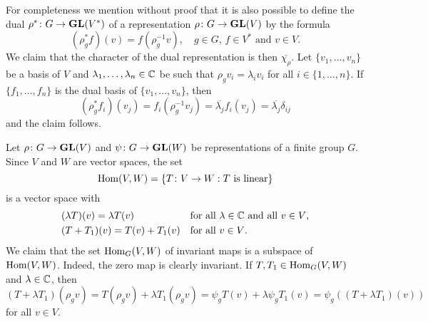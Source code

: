 For completeness we mention without proof that
it is also possible to define the dual $\rho^*\colon G\to\mathbf{GL}(V^*)$  
of a representation
$\rho\colon G\to\mathbf{GL}(V)$ by the formula
\[
(\rho^*_gf)(v)=f(\rho^{-1}_gv),\quad
g\in G,\,f\in V^*\text{ and }v\in V.
\]  
We claim that the character of the dual representation is then 
$\overline{\chi_\rho}$. Let $\{v_1,\dots,v_n\}$ be a basis of $V$
and $\lambda_1,\dots,\lambda_n\in\mathbb{C}$ be such that $\rho_gv_i=\lambda_iv_i$ for all $i\in\{1,\dots,n\}$. If $\{f_1,\dots,f_n\}$ is the dual basis of $\{v_1,\dots,v_n\}$, then 
\[
(\rho^*_gf_i)(v_j)=f_i(\rho_g^{-1}v_j)
=\overline{\lambda_j}f_i(v_j)
=\overline{\lambda_j}\delta_{ij}
\]
and the claim follows. 
%	
%
%	
%	  
%	


Let $\rho\colon G\to\mathbf{GL}(V)$ and $\psi\colon G\to\mathbf{GL}(W)$ be representations of a finite group
$G$. Since $V$ and $W$ are vector spaces, the set 
\[
\operatorname{Hom}(V,W)=\{T\colon V\to W:\text{$T$ is linear}\}
\]
is a vector space with 
\begin{align*}
&(\lambda T)(v)=\lambda T(v) && \text{for all $\lambda\in\mathbb{C}$ and all $v\in V$,}\\ 
&(T+T_1)(v)=T(v)+T_1(v) &&\text{for all $v\in V$.}
\end{align*}
We claim that the set $\operatorname{Hom}_G(V,W)$ of invariant maps
is a subspace of $\operatorname{Hom}(V,W)$. Indeed, the zero map is clearly invariant. If $T,T_1\in\operatorname{Hom}_G(V,W)$ 
and $\lambda\in\mathbb{C}$, then
\[
(T+\lambda T_1)(\rho_g v)
=T(\rho_gv)+\lambda T_1(\rho_gv)
=\psi_gT(v)+\lambda \psi_gT_1(v)
=\psi_g((T+\lambda T_1)(v))
\]
for all $v\in V$. 
 
